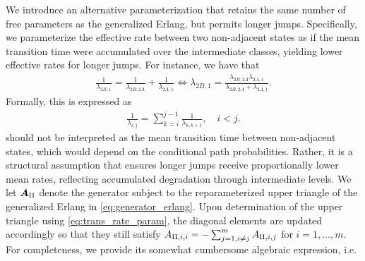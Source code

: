 We introduce an alternative parameterization that retains the same number of free parameters as the generalized Erlang, but permits longer jumps. %
Specifically, we parameterize the effective rate between two non-adjacent states as if the mean transition time were accumulated over the intermediate classes, yielding lower effective rates for longer jumps.
For instance, we have that
\begin{align*}
    \frac{1}{\lambda_{2B, 1}} = \frac{1}{\lambda_{2B, 2A}} + \frac{1}{\lambda_{2A, 1}}
    \iff \lambda_{2B,1} = \frac{\lambda_{2B, 2A} \lambda_{2A, 1}}{\lambda_{2B, 2A} + \lambda_{2A, 1}}. 
\end{align*}
Formally, this is expressed as
\begin{align}
    \frac{1}{\lambda_{i,j}} = \sum_{k = i}^{j-1} \frac{1}{\lambda_{k,k+1}}, \quad i < j. \label{eq:trans_rate_param}
\end{align}
 should not be interpreted as the mean transition time between non-adjacent states, which would depend on the conditional path probabilities. Rather, it is a structural assumption that ensures longer jumps receive proportionally lower mean rates, reflecting accumulated degradation through intermediate levels.
We let $\bm{A}_{\RN{2}}$ denote the generator subject to the reparameterized upper triangle of the generalized Erlang in \cref{eq:generator_erlang}.
Upon determination of the upper triangle using \cref{eq:trans_rate_param}, the diagonal elements are updated accordingly so that they still satisfy $A_{\RN{2},i,i}= -\sum_{j=1, i \neq j}^m A_{\RN{2},i,j}$ for $i = 1, \dots, m$. For completeness, we provide its somewhat cumbersome algebraic expression, i.e.
